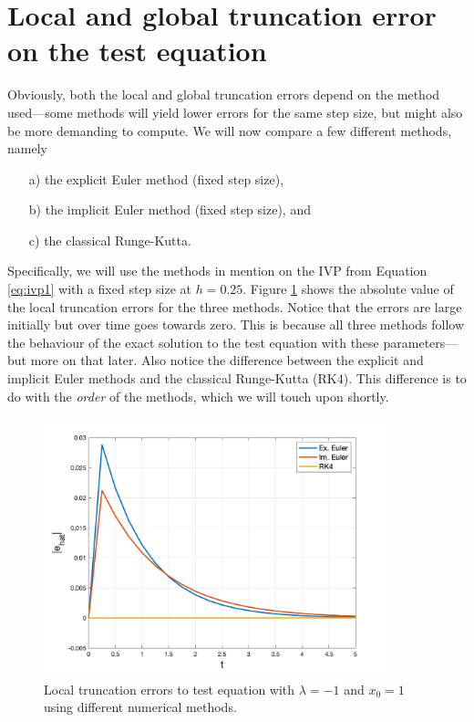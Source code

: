 \section{Local and global truncation error on the test equation}
Obviously, both the local and global truncation errors depend on the method used---some methods will yield lower errors for the same step size, but might also be more demanding to compute. We will now compare a few different methods, namely 
\begin{itemize}
    \item[a)] the explicit Euler method (fixed step size),
    \item[b)] the implicit Euler method (fixed step size), and 
    \item[c)] the classical Runge-Kutta.
\end{itemize}
Specifically, we will use the methods in mention on the IVP from Equation \ref{eq:ivp1} with a fixed step size at $h=0.25$. Figure \ref{fig1:local_err1} shows the absolute value of the local truncation errors for the three methods. Notice that the errors are large initially but over time goes towards zero. This is because all three methods follow the behaviour of the exact solution to the test equation with these parameters---but more on that later. Also notice the difference between the explicit and implicit Euler methods and the classical Runge-Kutta (RK4). This difference is to do with the \textit{order} of the methods, which we will touch upon shortly.

\begin{figure}[H]
    \centering
    \includegraphics[width=10cm]{graphics/opg1/local_err1.png}
    \caption{Local truncation errors to test equation with $\lambda=-1$ and $x_0=1$ using different numerical methods.}
    \label{fig1:local_err1}
\end{figure}

